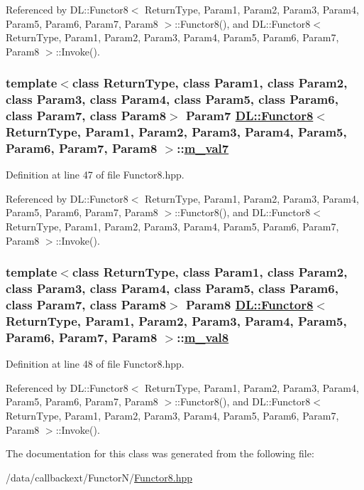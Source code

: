 Referenced by DL::Functor8$<$ Return\-Type, Param1, Param2, Param3, Param4, Param5, Param6, Param7, Param8 $>$::Functor8(), and DL::Functor8$<$ Return\-Type, Param1, Param2, Param3, Param4, Param5, Param6, Param7, Param8 $>$::Invoke().\hypertarget{classDL_1_1Functor8_r7}{
\subsubsection[m\_\-val7]{\setlength{\rightskip}{0pt plus 5cm}template$<$class Return\-Type, class Param1, class Param2, class Param3, class Param4, class Param5, class Param6, class Param7, class Param8$>$ Param7 \hyperlink{classDL_1_1Functor8}{DL::Functor8}$<$ Return\-Type, Param1, Param2, Param3, Param4, Param5, Param6, Param7, Param8 $>$::\hyperlink{classDL_1_1Functor8_r7}{m\_\-val7}}}
\label{classDL_1_1Functor8_r7}




Definition at line 47 of file Functor8.hpp.

Referenced by DL::Functor8$<$ Return\-Type, Param1, Param2, Param3, Param4, Param5, Param6, Param7, Param8 $>$::Functor8(), and DL::Functor8$<$ Return\-Type, Param1, Param2, Param3, Param4, Param5, Param6, Param7, Param8 $>$::Invoke().\hypertarget{classDL_1_1Functor8_r8}{
\subsubsection[m\_\-val8]{\setlength{\rightskip}{0pt plus 5cm}template$<$class Return\-Type, class Param1, class Param2, class Param3, class Param4, class Param5, class Param6, class Param7, class Param8$>$ Param8 \hyperlink{classDL_1_1Functor8}{DL::Functor8}$<$ Return\-Type, Param1, Param2, Param3, Param4, Param5, Param6, Param7, Param8 $>$::\hyperlink{classDL_1_1Functor8_r8}{m\_\-val8}}}
\label{classDL_1_1Functor8_r8}




Definition at line 48 of file Functor8.hpp.

Referenced by DL::Functor8$<$ Return\-Type, Param1, Param2, Param3, Param4, Param5, Param6, Param7, Param8 $>$::Functor8(), and DL::Functor8$<$ Return\-Type, Param1, Param2, Param3, Param4, Param5, Param6, Param7, Param8 $>$::Invoke().

The documentation for this class was generated from the following file:\begin{CompactItemize}
\item 
/data/callbackext/Functor\-N/\hyperlink{Functor8_8hpp}{Functor8.hpp}\end{CompactItemize}
